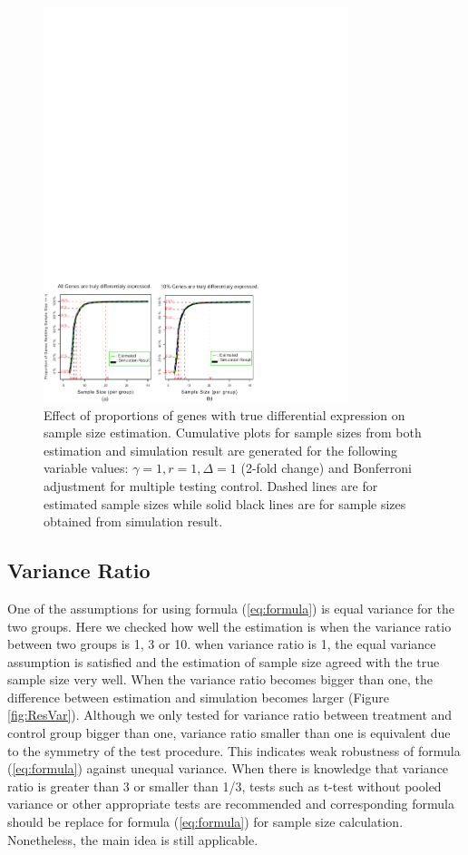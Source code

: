 \documentclass{bioinfo}
\begin{document}
\begin{figure}[h]
  \centerline{\includegraphics*[width=3.5in]{ResAlt.pdf}}
  \caption[Effect of proportions of genes with true differential expression on sample size estimation]
  {Effect of proportions of genes with true differential expression on sample size estimation.
    Cumulative plots for sample sizes from both estimation and simulation result
    are generated for the following variable values: $\gamma = 1, r = 1, \Delta = 1$ (2-fold
    change) and Bonferroni adjustment for multiple testing control. Dashed lines are for estimated sample sizes
    while solid black lines are for sample sizes obtained from simulation result.}
  \label{fig:ResAlt}
\end{figure}

\subsection{Variance Ratio}

One of the assumptions for using formula (\ref{eq:formula}) is
equal variance for the two groups. Here we checked how well the
estimation is when the variance ratio between two groups is 1, 3
or 10. when variance ratio is 1, the equal variance assumption is
satisfied and the estimation of sample size agreed with the true
sample size very well. When the variance ratio becomes bigger than
one, the difference between estimation and simulation becomes
larger (Figure \ref{fig:ResVar}). Although we only tested for
variance ratio between treatment and control group bigger than
one, variance ratio smaller than one is equivalent due to the
symmetry of the test procedure. This indicates weak robustness of
formula (\ref{eq:formula}) against unequal variance. When there is
knowledge that variance ratio is greater than 3 or smaller than
1/3,  tests such as t-test without pooled variance or other
appropriate tests are recommended and corresponding formula should
be replace for formula (\ref{eq:formula}) for sample size
calculation. Nonetheless, the main idea is still applicable.
\end{document}
